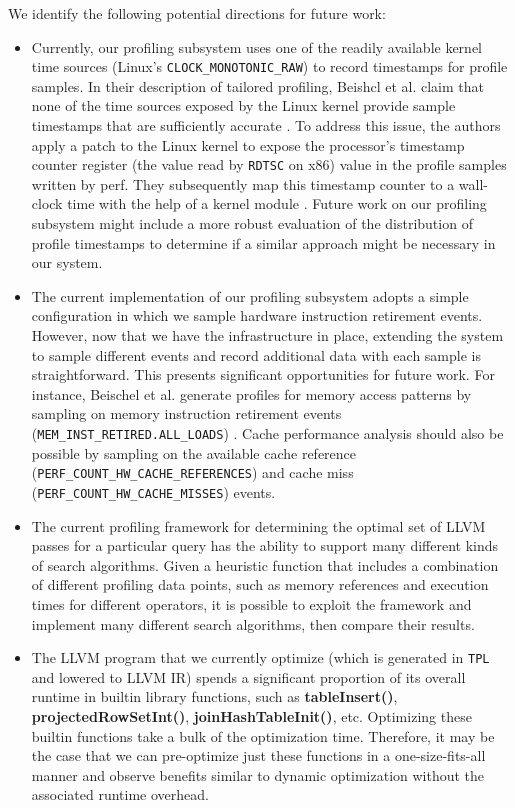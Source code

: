 \documentclass{vldb}
\newcommand{\tpl}{\texttt{TPL}\xspace}
\newcommand{\dbCode}[1]{{\sffamily\small \textbf{#1}}\xspace}
\begin{document}
We identify the following potential directions for future work:
\begin{itemize}
    \item Currently, our profiling subsystem uses one of the readily available kernel time sources (Linux's \lstinline{CLOCK_MONOTONIC_RAW}) to record timestamps for profile samples. In their description of tailored profiling, Beishcl et al. claim that none of the time sources exposed by the Linux kernel provide sample timestamps that are sufficiently accurate \cite{beischl21}. To address this issue, the authors apply a patch to the Linux kernel to expose the processor's timestamp counter register (the value read by \lstinline{RDTSC} on x86) value in the profile samples written by perf. They subsequently map this timestamp counter to a wall-clock time with the help of a kernel module \cite{beischl21}. Future work on our profiling subsystem might include a more robust evaluation of the distribution of profile timestamps to determine if a similar approach might be necessary in our system. 
    \item The current implementation of our profiling subsystem adopts a simple configuration in which we sample hardware instruction retirement events. However, now that we have the infrastructure in place, extending the system to sample different events and record additional data with each sample is straightforward. This presents significant opportunities for future work. For instance, Beischel et al. generate profiles for memory access patterns by sampling on memory instruction retirement events (\lstinline{MEM_INST_RETIRED.ALL_LOADS}) \cite{beischl21}. Cache performance analysis should also be possible by sampling on the available cache reference (\lstinline{PERF_COUNT_HW_CACHE_REFERENCES}) and cache miss (\lstinline{PERF_COUNT_HW_CACHE_MISSES}) events.
    \item The current profiling framework for determining the optimal set of LLVM passes for a particular query has the ability to support many different kinds of search algorithms. Given a heuristic function that includes a combination of different profiling data points, such as memory references and execution times for different operators, it is possible to exploit the framework and implement many different search algorithms, then compare their results.
    \item The LLVM program that we currently optimize (which is generated in \tpl and lowered to LLVM IR) spends a significant proportion of its overall runtime in builtin library functions, such as \dbCode{tableInsert()}, \dbCode{projectedRowSetInt()}, \dbCode{joinHashTableInit()}, etc. Optimizing these builtin functions take a bulk of the optimization time. Therefore, it may be the case that we can pre-optimize just these functions in a one-size-fits-all manner and observe benefits similar to dynamic optimization without the associated runtime overhead.
\end{itemize}
\end{document}
